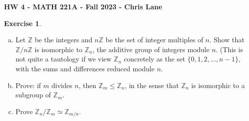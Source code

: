 \documentclass[11pt,oneside]{article}
\numberwithin{equation}{section}
\theoremstyle{definition}
\newtheorem{exercise}{Exercise}
\def\ZZ{\mathbb{Z}}
\begin{document}
\textbf{HW 4 - MATH 221A - Fall 2023 - Chris Lane}

\begin{exercise}
  \begin{enumerate}[(a)]
  \item
    Let $\ZZ$ be the integers and $n\ZZ$ be the set of integer
    multiples of $n$.  Show that $\ZZ / n\ZZ$ is isomorphic to $\ZZ_n$,
    the additive group of integers module $n$.  (This is not quite a
    tautology if we view $\ZZ_n$ concretely as the set $\{0, 1, 2, ..., n-1\}$,
    with the sums and differences reduced module $n$.
  \item
     Prove: if $m$ divides $n$, then $\ZZ_m \leq \ZZ_n$, in the sense
     that $\ZZ_n$ is isomorphic to a subgroup of $\ZZ_m$.
   \item
     Prove $\ZZ_n/\ZZ_m \simeq \ZZ_{m/n}$. 
  \end{enumerate}
\end{exercise}
\end{document}
